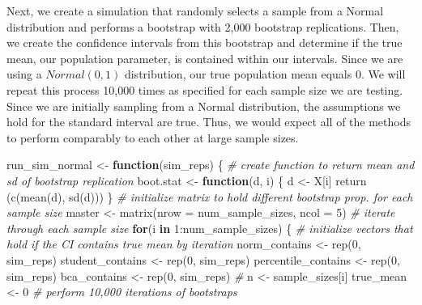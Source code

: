 \documentclass[12pt]{article}
\newenvironment{Shaded}{\begin{snugshade}}{\end{snugshade}}
\newcommand{\AttributeTok}[1]{\textcolor[rgb]{0.77,0.63,0.00}{#1}}
\newcommand{\CommentTok}[1]{\textcolor[rgb]{0.56,0.35,0.01}{\textit{#1}}}
\newcommand{\ControlFlowTok}[1]{\textcolor[rgb]{0.13,0.29,0.53}{\textbf{#1}}}
\newcommand{\DecValTok}[1]{\textcolor[rgb]{0.00,0.00,0.81}{#1}}
\newcommand{\FunctionTok}[1]{\textcolor[rgb]{0.00,0.00,0.00}{#1}}
\newcommand{\NormalTok}[1]{#1}
\newcommand{\OtherTok}[1]{\textcolor[rgb]{0.56,0.35,0.01}{#1}}
\newcommand{\SpecialCharTok}[1]{\textcolor[rgb]{0.00,0.00,0.00}{#1}}
\begin{document}
Next, we create a simulation that randomly selects a sample from a
Normal distribution and performs a bootstrap with 2,000 bootstrap
replications. Then, we create the confidence intervals from this
bootstrap and determine if the true mean, our population parameter, is
contained within our intervals. Since we are using a \(Normal(0,1)\)
distribution, our true population mean equals 0. We will repeat this
process 10,000 times as specified for each sample size we are testing.
Since we are initially sampling from a Normal distribution, the
assumptions we hold for the standard interval are true. Thus, we would
expect all of the methods to perform comparably to each other at large
sample sizes.

\begin{Shaded}
\begin{Highlighting}[]
\NormalTok{run\_sim\_normal }\OtherTok{\textless{}{-}} \ControlFlowTok{function}\NormalTok{(sim\_reps) \{}
  \CommentTok{\# create function to return mean and sd of bootstrap replication}
\NormalTok{  boot.stat }\OtherTok{\textless{}{-}} \ControlFlowTok{function}\NormalTok{(d, i) \{}
\NormalTok{    d }\OtherTok{\textless{}{-}}\NormalTok{ X[i]}
    \FunctionTok{return}\NormalTok{ (}\FunctionTok{c}\NormalTok{(}\FunctionTok{mean}\NormalTok{(d), }\FunctionTok{sd}\NormalTok{(d)))}
\NormalTok{  \}}
  \CommentTok{\# initialize matrix to hold different bootstrap prop. for each sample size}
\NormalTok{  master }\OtherTok{\textless{}{-}} \FunctionTok{matrix}\NormalTok{(}\AttributeTok{nrow =}\NormalTok{ num\_sample\_sizes, }\AttributeTok{ncol =} \DecValTok{5}\NormalTok{)}
  \CommentTok{\# iterate through each sample size}
  \ControlFlowTok{for}\NormalTok{(i }\ControlFlowTok{in} \DecValTok{1}\SpecialCharTok{:}\NormalTok{num\_sample\_sizes) \{}
    \CommentTok{\# initialize vectors that hold if the CI contains true mean by iteration}
\NormalTok{    norm\_contains }\OtherTok{\textless{}{-}} \FunctionTok{rep}\NormalTok{(}\DecValTok{0}\NormalTok{, sim\_reps)}
\NormalTok{    student\_contains }\OtherTok{\textless{}{-}} \FunctionTok{rep}\NormalTok{(}\DecValTok{0}\NormalTok{, sim\_reps)}
\NormalTok{    percentile\_contains }\OtherTok{\textless{}{-}} \FunctionTok{rep}\NormalTok{(}\DecValTok{0}\NormalTok{, sim\_reps)}
\NormalTok{    bca\_contains }\OtherTok{\textless{}{-}} \FunctionTok{rep}\NormalTok{(}\DecValTok{0}\NormalTok{, sim\_reps)}
    \CommentTok{\# }
\NormalTok{    n }\OtherTok{\textless{}{-}}\NormalTok{ sample\_sizes[i]}
\NormalTok{    true\_mean }\OtherTok{\textless{}{-}} \DecValTok{0}
    \CommentTok{\# perform 10,000 iterations of bootstraps}

\end{Highlighting}
\end{Shaded}
\end{document}
